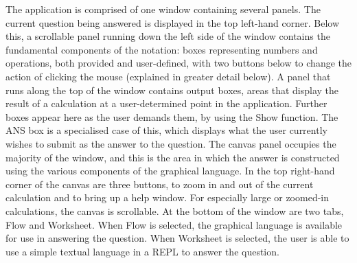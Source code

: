 \documentclass[12pt,twoside,notitlepage,xetex]{report}
\begin{document}
The application is comprised of one window containing several panels.  The
current question being answered is displayed in the top left-hand corner.
Below this, a scrollable panel running down the left side of the window
contains the fundamental components of the notation: boxes representing numbers
and operations, both provided and user-defined, with two buttons below to
change the action of clicking the mouse (explained in greater detail below).  A
panel that runs along the top of the window contains output boxes, areas that
display the result of a calculation at a user-determined point in the
application.  Further boxes appear here as the user demands them, by using the
{\sfapp Show} function.  The {\sfapp ANS} box is a specialised case of this,
which displays what the user currently wishes to submit as the answer to the
question.  The canvas panel occupies the majority of the window, and this is
the area in which the answer is constructed using the various components of the
graphical language.  In the top right-hand corner of the canvas are three
buttons, to zoom in and out of the current calculation and to bring up a help
window.  For especially large or zoomed-in calculations, the canvas is
scrollable.  At the bottom of the window are two tabs, {\sfapp Flow} and
{\sfapp Worksheet}.  When {\sfapp Flow} is selected, the graphical language is
available for use in answering the question.  When {\sfapp Worksheet} is
selected, the user is able to use a simple textual language in a REPL to answer
the question.
\end{document}
